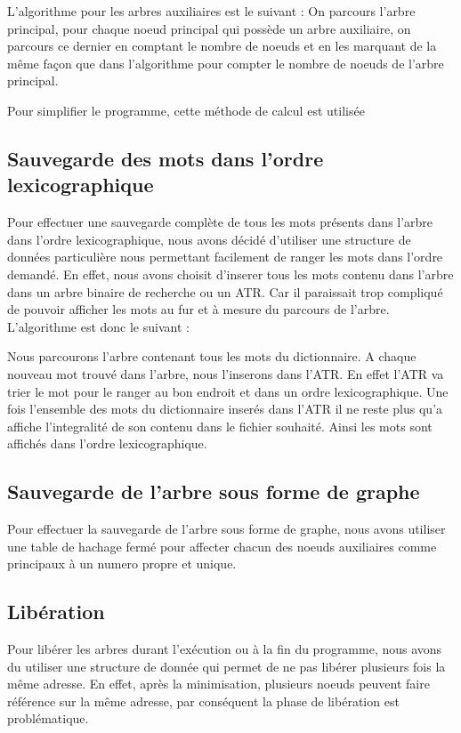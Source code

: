 \documentclass[15pt, a4paper]{article}
\begin{document}
\bigskip

L'algorithme pour les arbres auxiliaires est le suivant : On parcours l'arbre principal, 
pour chaque noeud principal qui possède un arbre auxiliaire, on parcours ce dernier en
comptant le nombre de noeuds et en les marquant de la même façon que dans l'algorithme pour 
compter le nombre de noeuds de l'arbre principal.

Pour simplifier le programme, cette méthode de calcul est utilisée

\subsection{Sauvegarde des mots dans l'ordre lexicographique}

Pour effectuer une sauvegarde complète de tous les mots présents dans l'arbre dans l'ordre
lexicographique, nous avons décidé d'utiliser une structure de données particulière nous 
permettant facilement de ranger les mots dans l'ordre demandé. En effet, nous avons choisit
d'inserer tous les mots contenu dans l'arbre dans un arbre binaire de recherche ou un ATR.
Car il paraissait trop compliqué de pouvoir afficher les mots au fur et à mesure du parcours
de l'arbre. L'algorithme est donc le suivant :

\bigskip

Nous parcourons l'arbre contenant tous les mots du dictionnaire. A chaque nouveau mot trouvé
dans l'arbre, nous l'inserons dans l'ATR. En effet l'ATR va trier le mot pour le ranger au 
bon endroit et dans un ordre lexicographique. Une fois l'ensemble des mots du dictionnaire
inserés dans l'ATR il ne reste plus qu'a affiche l'integralité de son contenu dans le fichier
souhaité. Ainsi les mots sont affichés dans l'ordre lexicographique.

\subsection{Sauvegarde de l'arbre sous forme de graphe}

Pour effectuer la sauvegarde de l'arbre sous forme de graphe, nous avons utiliser une table de hachage
fermé pour affecter chacun des noeuds auxiliaires comme principaux à un numero propre et unique.

\subsection{Libération}

Pour libérer les arbres durant l'exécution ou à la fin du programme, nous avons du
utiliser une structure de donnée qui permet de ne pas libérer plusieurs
fois la même adresse. En effet, après la minimisation, plusieurs noeuds
peuvent faire référence sur la même adresse, par conséquent la phase de
libération est problématique.
\end{document}
